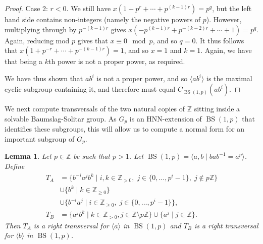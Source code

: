 \documentclass[11pt]{amsart}
\newtheorem{lem}[theorem]{Lemma}
\theoremstyle{definition}
\numberwithin{theorem}{section}
\DeclareMathOperator{\BS}{BS}
\newcommand{\Z}{\mathbb{Z}}
\begin{document}
\begin{proof}
	Case 2: \(r < 0\). We still have \(x(1 + p^r + \cdots + p^{(k - 1)r}) =
	p^q\), but the left hand side contains non-integers (namely the negative
	powers of \(p\)). However, multiplying through by \(p^{-(k - 1)r}\) gives
	\(x(-p^{(k - 1) r} + p^{-(k - 2)r} + \cdots + 1) = p^q\). Again,
	reducing mod \(p\) gives that \(x \equiv 0 \mod p\), and so
	\(q = 0\). It thus follows that \(x(1 + p^{-r} + \cdots + p^{-(k - 1)r})
	= 1\), and so \(x = 1\) and \(k = 1\). Again, we have that being a
	\(k\)th power is not a proper power, as required.

	We have thus shown that \(ab^i\) is not a proper power, and so
	\(\langle ab^i \rangle\) is the maximal cyclic subgroup containing
	it, and therefore must equal \(C_{\BS(1, p)}(ab^i)\).
\end{proof}

We next compute transversals of the two natural copies of \(\Z\) sitting inside
a solvable Baumslag-Solitar group. As \(G_p\) is an HNN-extension of \(\BS(1, p)\)
that identifies these subgroups, this will allow us to compute a normal form
for an important subgroup of \(G_p\). 

\begin{lem}
	\label{transversals}
	Let \(p \in \Z\) be such that \(p > 1\).
	Let \(\BS(1, p) = \langle a, b \mid bab^{-1} = a^p\rangle\). Define
	\begin{align*}
	T_A & =    
		\{ b^{-i} a^j b^k \mid i,k \in \Z_{> 0}, \; j \in \{0, \ldots, p^i -
		1\}, \; j \not\in p\Z \}  \\
& \cup \{ b^k \mid k \in \Z_{\geq 0} \} \\ 
& \cup \{ b^{-i} a^j \mid i \in \Z_{\geq 0}, \; j \in \{0, \ldots, p^i - 1\} \}, \\ 
	T_B & = \{ a^j  b^k\mid k \in \Z_{> 0}, j \in \Z \setminus p\Z\}
	\cup \{a^j \mid j \in \Z\}.
	\end{align*}
	Then \(T_A\) is a right transversal for \(\langle a \rangle\) in
	\(\BS(1, p)\) and \(T_B\) is a right transversal for \(\langle b \rangle\)
	in \(\BS(1, p)\).
\end{lem}
\end{document}
